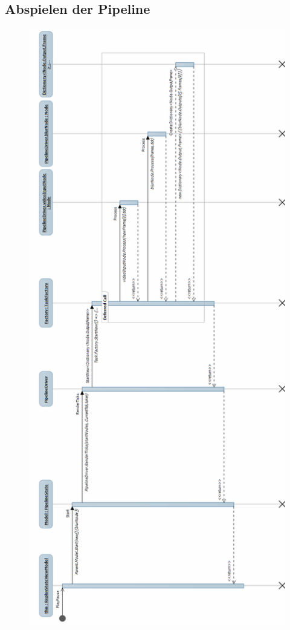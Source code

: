 \subsection{Abspielen der Pipeline}
\begin{figure}[h!]
\begin{center}
\includegraphics[height=0.9\textheight]{Diagrams/play.png}
\end{center}
\end{figure}
\newpage

